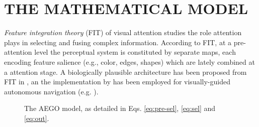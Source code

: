 \documentclass[letterpaper, 10 pt, conference]{ieeeconf}  %
\begin{document}
	
	\section{THE MATHEMATICAL MODEL}	
	\label{sec:model}
	
	\textit{Feature integration theory} (FIT) \cite{treisman1980} of visual attention studies the role attention plays in selecting and fusing complex information. According to FIT, at a pre-attention level the perceptual system is constituted by separate maps, each encoding feature salience (e.g., color, edges, shapes) which are lately combined at a attention stage. A biologically plausible architecture has been proposed from FIT in \cite{koch1985}, an the implementation by \cite{itti1998} has been employed for visually-guided autonomous navigation (e.g. \cite{siagian2014}).

	\begin{figure}[h!]
		\caption{The AEGO model, as detailed in Eqs. \eqref{eq:pre-sel}, \eqref{eq:sel} and \eqref{eq:out}.}
		\label{fig:AEGO}
	\end{figure}
\end{document}
